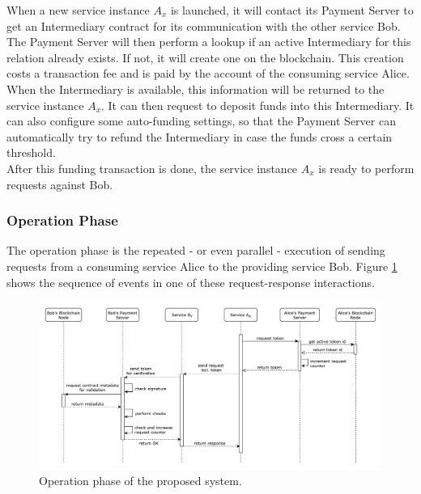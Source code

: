 \documentclass[a4paper,12pt]{scrartcl}
\begin{document}
When a new service instance $A_x$ is launched, it will contact its Payment Server to get an Intermediary contract for its communication with the other service Bob. The Payment Server will then perform a lookup if an active Intermediary for this relation already exists. If not, it will create one on the blockchain. This creation costs a transaction fee and is paid by the account of the consuming service Alice.\\

When the Intermediary is available, this information will be returned to the service instance $A_x$. It can then request to deposit funds into this Intermediary. It can also configure some auto-funding settings, so that the Payment Server can automatically try to refund the Intermediary in case the funds cross a certain threshold.\\

After this funding transaction is done, the service instance $A_x$ is ready to perform requests against Bob.

\subsubsection{Operation Phase}

The operation phase is the repeated - or even parallel - execution of sending requests from a consuming service Alice to the providing service Bob. Figure \ref{fig:OperationPhase} shows the sequence of events in one of these request-response interactions.\\

\begin{figure}[H]
\centering
\includegraphics[width=450pt]{Images/OperationPhase.pdf}
\caption{Operation phase of the proposed system.}
\label{fig:OperationPhase}
\end{figure}
\end{document}
